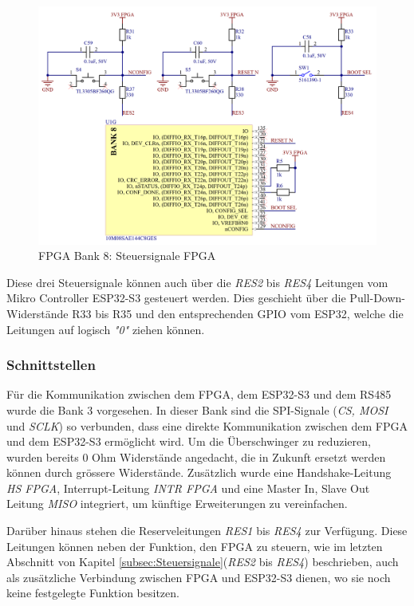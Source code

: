\begin{figure}[H]
    \centering
    \includegraphics[width=1.0\linewidth]{Figures/Chap3/Schematics/Bank8_Admin.png}
    \caption{FPGA Bank 8: Steuersignale FPGA}
    \label{FPGA Admin}
\end{figure}

Diese drei Steuersignale können auch über die \textit{RES2} bis \textit{RES4} Leitungen vom Mikro Controller ESP32-S3 gesteuert werden. Dies geschieht über die Pull-Down-Widerstände R33 bis R35 und den entsprechenden GPIO vom ESP32, welche die Leitungen auf logisch \textit{"0"} ziehen können.

\subsubsection{Schnittstellen}
\label{subsubsec:Schnittstellen}
Für die Kommunikation zwischen dem FPGA, dem ESP32-S3 und dem RS485 wurde die Bank 3 vorgesehen. In dieser Bank sind die SPI-Signale (\textit{CS, MOSI} und \textit{SCLK}) so verbunden, dass eine direkte Kommunikation zwischen dem FPGA und dem ESP32-S3 ermöglicht wird. Um die Überschwinger zu reduzieren, wurden bereits 0 Ohm Widerstände angedacht, die in Zukunft ersetzt werden können durch grössere Widerstände. Zusätzlich wurde eine Handshake-Leitung \textit{HS FPGA}, Interrupt-Leitung \textit{INTR FPGA} und eine Master In, Slave Out Leitung \textit{MISO} integriert, um künftige Erweiterungen zu vereinfachen.

Darüber hinaus stehen die Reserveleitungen \textit{RES1} bis \textit{RES4} zur Verfügung. Diese Leitungen können neben der Funktion, den FPGA zu steuern, wie im letzten Abschnitt von Kapitel \ref{subsec:Steuersignale}(\textit{RES2} bis \textit{RES4}) beschrieben, auch als zusätzliche Verbindung zwischen FPGA und ESP32-S3 dienen, wo sie noch keine festgelegte Funktion besitzen.

